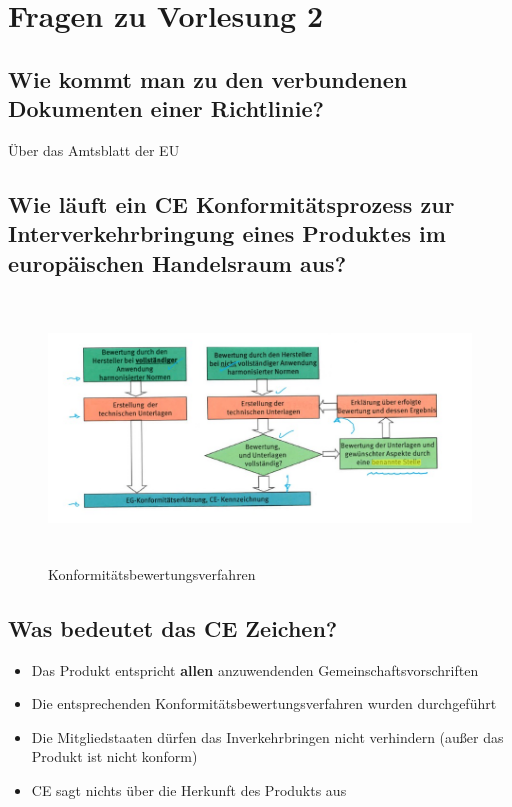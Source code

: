 \section{Fragen zu Vorlesung 2}
\subsection{Wie kommt man zu den verbundenen Dokumenten einer Richtlinie?}
Über das Amtsblatt der EU

\subsection{Wie läuft ein CE Konformitätsprozess zur Interverkehrbringung eines Produktes im europäischen Handelsraum aus?}

\begin{figure}[ht]
  \centering
  \includegraphics[height=7cm]{src/assets/pictures/vl2_konformitaetsprozess.jpg}
  \caption{Konformitätsbewertungsverfahren}
\end{figure}

\subsection{Was bedeutet das CE Zeichen?}
\begin{itemize}
  \item Das Produkt entspricht \textbf{allen} anzuwendenden Gemeinschaftsvorschriften
  \item Die entsprechenden Konformitätsbewertungsverfahren wurden durchgeführt
  \item Die Mitgliedstaaten dürfen das Inverkehrbringen nicht verhindern (außer das Produkt ist nicht konform)
  \item CE sagt nichts über die Herkunft des Produkts aus
\end{itemize}

